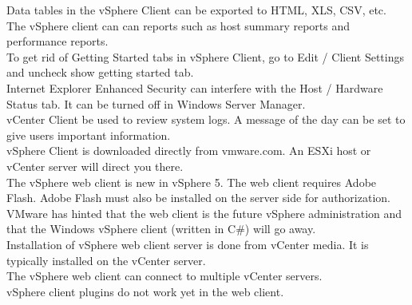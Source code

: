 Data tables in the vSphere Client can be exported to HTML, XLS, CSV, etc.\\

The vSphere client can can reports such as host summary reports and performance
reports.\\

To get rid of Getting Started tabs in vSphere Client, go to
Edit / Client Settings and uncheck show getting started tab.\\

Internet Explorer Enhanced Security can interfere with the Host / Hardware
Status tab. It can be turned off in Windows Server Manager.\\

vCenter Client be used to review system logs. A message of the day can be set
to give users important information.\\

vSphere Client is downloaded directly from vmware.com. An ESXi host or vCenter
server will direct you there.\\

The vSphere web client is new in vSphere 5. The web client requires Adobe Flash.
Adobe Flash must also be installed on the server side for authorization.\\

VMware has hinted that the web client is the future vSphere administration
and that the Windows vSphere client (written in C\#) will go away.\\

Installation of vSphere web client server is done from vCenter media. It is
typically installed on the vCenter server.\\

The vSphere web client can connect to multiple vCenter servers.\\

vSphere client plugins do not work yet in the web client.

